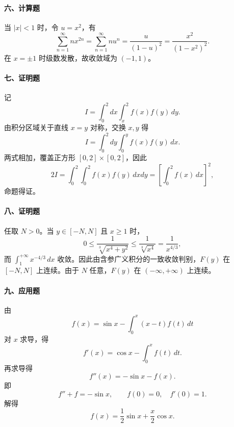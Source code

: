\paragraph{六、计算题}

当 $|x|<1$ 时，令 $u=x^2$，有
\[
  \sum_{n=1}^{\infty}nx^{2n}
  =
  \sum_{n=1}^{\infty}nu^n
  =
  \frac{u}{(1-u)^2}
  =
  \frac{x^2}{(1-x^2)^2}.
\]
在 $x=\pm1$ 时级数发散，故收敛域为 $(-1,1)$。

\paragraph{七、证明题}

记
\[
  I=\int_0^2 dx\int_x^2 f(x)f(y)\,dy.
\]
由积分区域关于直线 $x=y$ 对称，交换 $x,y$ 得
\[
  I=\int_0^2 dy\int_0^y f(x)f(y)\,dx.
\]
两式相加，覆盖正方形 $[0,2]\times[0,2]$，因此
\[
  2I=\int_0^2\int_0^2 f(x)f(y)\,dxdy
  =
  \left[\int_0^2 f(x)\,dx\right]^2,
\]
命题得证。

\paragraph{八、证明题}

任取 $N>0$。当 $y\in[-N,N]$ 且 $x\ge1$ 时，
\[
  0\le \frac1{\sqrt[3]{x^4+y^2}}\le \frac1{\sqrt[3]{x^4}}=\frac1{x^{4/3}},
\]
而 $\int_1^{+\infty}x^{-4/3}\,dx$ 收敛。因此由含参广义积分的一致收敛判别，$F(y)$ 在 $[-N,N]$ 上连续。由于 $N$ 任意，$F(y)$ 在 $(-\infty,+\infty)$ 上连续。

\paragraph{九、应用题}

由
\[
  f(x)=\sin x-\int_0^x(x-t)f(t)\,dt
\]
对 $x$ 求导，得
\[
  f'(x)=\cos x-\int_0^x f(t)\,dt.
\]
再求导得
\[
  f''(x)=-\sin x-f(x).
\]
即
\[
  f''+f=-\sin x,\qquad f(0)=0,\quad f'(0)=1.
\]
解得
\[
  f(x)=\frac12\sin x+\frac{x}{2}\cos x.
\]
